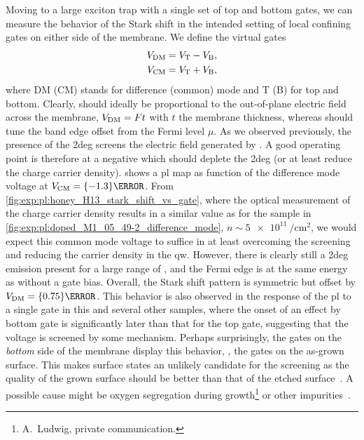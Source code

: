 Moving to a large exciton trap with a single set of top and bottom gates,
we can measure the behavior of the Stark shift in the intended setting of local confining gates on either side of the membrane.
We define the virtual gates
\begin{align}\label{eq:exp:observations:virtual_gates}
    V_{\mathrm{DM}} &= V_{\mathrm{T}} - V_{\mathrm{B}}, \\
    V_{\mathrm{CM}} &= V_{\mathrm{T}} + V_{\mathrm{B}},
\end{align}
where DM (CM) stands for difference (common) mode and T (B) for top and bottom.
Clearly, \VDM should ideally be proportional to the out-of-plane electric field across the membrane, $V_{\mathrm{DM}} = Ft$ with $t$ the membrane thickness, whereas \VCM should tune the band edge offset from the Fermi level $\mu$.
As we observed previously, the presence of the \gls{2deg} screens the electric field generated by \VDM.
A good operating point is therefore at a negative \VCM which should deplete the \gls{2deg} (or at least reduce the charge carrier density).
 shows a \gls{pl} map as function of the difference mode voltage \VDM at $\VCM = \qty{-1.3}{\volt}$.
From \cref{fig:exp:pl:honey_H13_stark_shift_vs_gate}, where the optical measurement of the charge carrier density results in a similar value as for the sample in \cref{fig:exp:pl:doped_M1_05_49-2_difference_mode}, $n\sim\qty{5e11}{\per\centi\meter\squared}$, we would expect this common mode voltage to suffice in at least overcoming the screening and reducing the carrier density in the \gls{qw}.
However, there is clearly still a \gls{2deg} emission present for a large range of \VDM, and the Fermi edge is at the same energy as without a gate bias.
Overall, the Stark shift pattern is symmetric but offset by $\VDM = \qty{0.75}{\volt}$.
This behavior is also observed in the response of the \gls{pl} to a single gate in this and several other samples, where the onset of an effect by bottom gate is significantly later than that for the top gate, suggesting that the voltage is screened by some mechanism.
Perhaps surprisingly, the gates on the \emph{bottom} side of the membrane display this behavior, \ie, the gates on the as-grown surface.
This makes surface states an unlikely candidate for the screening as the quality of the grown surface should be better than that of the etched surface~\cite{Descamps2021}.
A possible cause might be oxygen segregation during growth\footnote{A.~Ludwig, private communication.} or other impurities~\cite{Nguyen2020}.

